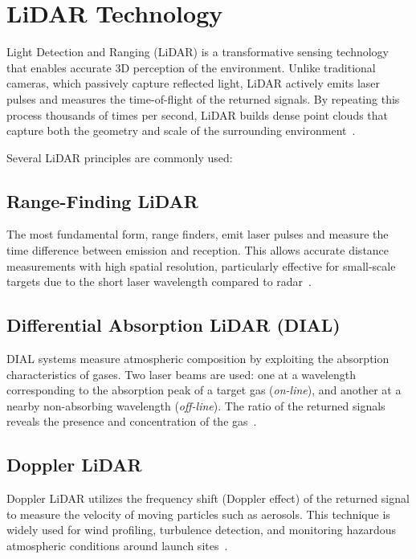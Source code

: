 \documentclass[english, bachelor, utf8]{base/thesis_telematics}
\begin{document}
\section{LiDAR Technology}
Light Detection and Ranging (LiDAR) is a transformative sensing technology that enables accurate 3D perception of the environment. 
Unlike traditional cameras, which passively capture reflected light, LiDAR actively emits laser pulses and measures the time-of-flight of the returned signals. 
By repeating this process thousands of times per second, LiDAR builds dense point clouds that capture both the geometry and scale of the surrounding environment~\cite{neon_lidar_basics}.

Several LiDAR principles are commonly used:
\subsection*{Range-Finding LiDAR}
The most fundamental form, range finders, emit laser pulses and measure the time difference between emission and reception. 
This allows accurate distance measurements with high spatial resolution, particularly effective for small-scale targets due to the short laser wavelength compared to radar~\cite{bleier_advanced_sensory_systems}.  

\subsection*{Differential Absorption LiDAR (DIAL)}
DIAL systems measure atmospheric composition by exploiting the absorption characteristics of gases. 
Two laser beams are used: one at a wavelength corresponding to the absorption peak of a target gas (\textit{on-line}), and another at a nearby non-absorbing wavelength (\textit{off-line}). 
The ratio of the returned signals reveals the presence and concentration of the gas~\cite{bleier_advanced_sensory_systems}.  

\subsection*{Doppler LiDAR}
Doppler LiDAR utilizes the frequency shift (Doppler effect) of the returned signal to measure the velocity of moving particles such as aerosols. 
This technique is widely used for wind profiling, turbulence detection, and monitoring hazardous atmospheric conditions around launch sites~\cite{bleier_advanced_sensory_systems}.  
\end{document}

